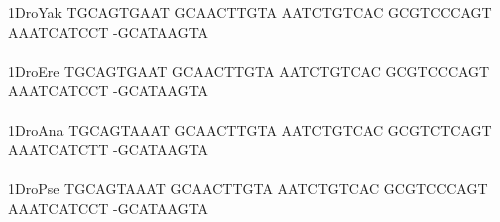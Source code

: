 \documentclass[11pt,twoside,reqno,a4paper]{article}
\begin{document}
{1\hspace*{3\charwidth}DroYak	TGCAGTGAAT	GCAACTTGTA	AATCTGTCAC	GCGTCCCAGT	AAATCATCCT	-GCATAAGTA	\\
\hspace*{4\charwidth}\hspace*{7\charwidth}\hspace*{1\charwidth}\hspace*{1\charwidth}\hspace*{1\charwidth}\hspace*{1\charwidth}\hspace*{1\charwidth}\hspace*{1\charwidth}\\
1\hspace*{3\charwidth}DroEre	TGCAGTGAAT	GCAACTTGTA	AATCTGTCAC	GCGTCCCAGT	AAATCATCCT	-GCATAAGTA	\\
\hspace*{4\charwidth}\hspace*{7\charwidth}\hspace*{1\charwidth}\hspace*{1\charwidth}\hspace*{1\charwidth}\hspace*{1\charwidth}\hspace*{1\charwidth}\hspace*{1\charwidth}\\
1\hspace*{3\charwidth}DroAna	TGCAGTAAAT	GCAACTTGTA	AATCTGTCAC	GCGTCTCAGT	AAATCATCTT	-GCATAAGTA	\\
\hspace*{4\charwidth}\hspace*{7\charwidth}\hspace*{1\charwidth}\hspace*{1\charwidth}\hspace*{1\charwidth}\hspace*{1\charwidth}\hspace*{1\charwidth}\hspace*{1\charwidth}\\
1\hspace*{3\charwidth}DroPse	TGCAGTAAAT	GCAACTTGTA	AATCTGTCAC	GCGTCCCAGT	AAATCATCCT	-GCATAAGTA	\\
\hspace*{4\charwidth}\hspace*{7\charwidth}\hspace*{1\charwidth}\hspace*{1\charwidth}\hspace*{1\charwidth}\hspace*{1\charwidth}\hspace*{1\charwidth}\hspace*{1\charwidth}\\
}
\end{document}
